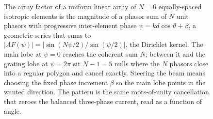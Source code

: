 \begin{figure}[htbp]
\centering
{}
\caption[Array factor of a uniform linear array]{The array factor of a
uniform linear array of $N = 6$ equally-spaced isotropic elements is the
magnitude of a phasor sum of $N$ unit phasors with progressive
inter-element phase $\psi = k d \cos\vartheta + \beta$, a geometric
series that sums to $|AF(\psi)| = |\sin(N\psi/2) / \sin(\psi/2)|$, the
Dirichlet kernel. The main lobe at $\psi = 0$ reaches the coherent sum
$N$; between it and the grating lobe at $\psi = 2\pi$ sit $N - 1 = 5$
nulls where the $N$ phasors close into a regular polygon and cancel
exactly. Steering the beam means choosing the fixed phase increment
$\beta$ so the main lobe points in the wanted direction. The pattern is
the same roots-of-unity cancellation that zeroes the balanced
three-phase current, read as a function of angle.}
\label{fig:vol02:ch03:array-factor}
\end{figure}
